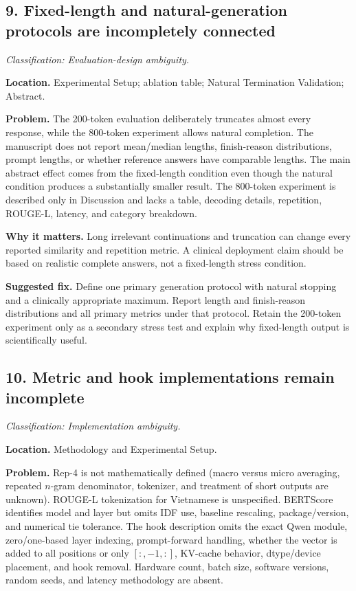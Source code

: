 \documentclass[11pt]{article}
\newcommand{\findinglabel}[1]{\textbf{#1}}
\newcommand{\classification}[1]{\textit{Classification: #1.}}
\begin{document}
\subsection*{9. Fixed-length and natural-generation protocols are incompletely connected}

\classification{Evaluation-design ambiguity}

\findinglabel{Location.} Experimental Setup; ablation table; Natural Termination Validation; Abstract.

\findinglabel{Problem.} The 200-token evaluation deliberately truncates almost every response, while the 800-token experiment allows natural completion.  The manuscript does not report mean/median lengths, finish-reason distributions, prompt lengths, or whether reference answers have comparable lengths.  The main abstract effect comes from the fixed-length condition even though the natural condition produces a substantially smaller result.  The 800-token experiment is described only in Discussion and lacks a table, decoding details, repetition, ROUGE-L, latency, and category breakdown.

\findinglabel{Why it matters.} Long irrelevant continuations and truncation can change every reported similarity and repetition metric.  A clinical deployment claim should be based on realistic complete answers, not a fixed-length stress condition.

\findinglabel{Suggested fix.} Define one primary generation protocol with natural stopping and a clinically appropriate maximum.  Report length and finish-reason distributions and all primary metrics under that protocol.  Retain the 200-token experiment only as a secondary stress test and explain why fixed-length output is scientifically useful.

\subsection*{10. Metric and hook implementations remain incomplete}

\classification{Implementation ambiguity}

\findinglabel{Location.} Methodology and Experimental Setup.

\findinglabel{Problem.} Rep-4 is not mathematically defined (macro versus micro averaging, repeated $n$-gram denominator, tokenizer, and treatment of short outputs are unknown).  ROUGE-L tokenization for Vietnamese is unspecified.  BERTScore identifies model and layer but omits IDF use, baseline rescaling, package/version, and numerical tie tolerance.  The hook description omits the exact Qwen module, zero/one-based layer indexing, prompt-forward handling, whether the vector is added to all positions or only $[:, -1, :]$, KV-cache behavior, dtype/device placement, and hook removal.  Hardware count, batch size, software versions, random seeds, and latency methodology are absent.
\end{document}
